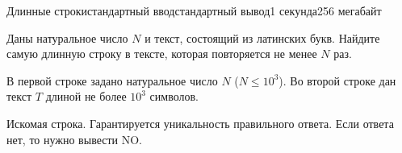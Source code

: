 \begin{problem}{Длинные строки}{стандартный ввод}{стандартный вывод}{1 секунда}{256 мегабайт}

Даны натуральное число $N$ и текст, состоящий из латинских букв. Найдите самую длинную строку в тексте, которая повторяется не менее $N$ раз.

\InputFile
В первой строке задано натуральное число $N$ ($N \le 10^3$). Во второй строке дан текст $T$ длиной не более $10^3$ символов.

\OutputFile
Искомая строка. Гарантируется уникальность правильного ответа. Если ответа нет, то нужно вывести NO. 

\Example

\begin{example}
%
\end{example}

\end{problem}

